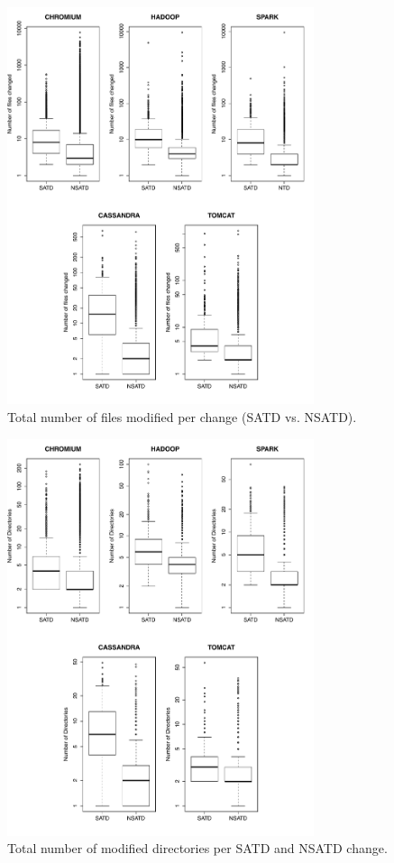 \begin{figure}[h]
	\centering
	\includegraphics[width=90mm]{figures/chapter3/number_of_files_changed_all_projects}
	\caption{Total number of files modified per change (SATD vs. NSATD).}
	\label{figure:tfcpc}
\end{figure}

\begin{figure}[h]
	\centering
	\includegraphics[width=90mm]{figures/chapter3/number_of_directories}
	\caption{Total number of modified directories per SATD and NSATD change.}
	\label{figure:number_of_directories}
\end{figure}


